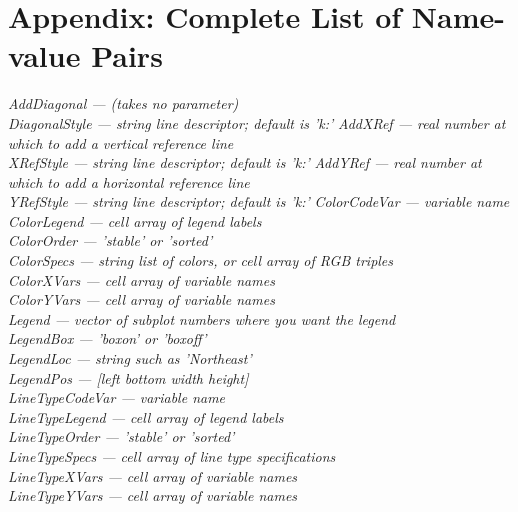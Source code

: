 \documentclass{article}
\newcommand{\namevalue}[2]{{\it #1 --- #2}}
\begin{document}
\appendix


\section{Appendix: Complete List of Name-value Pairs}

\namevalue{AddDiagonal}{(takes no parameter)} \\  %
\hspace*{1cm} \namevalue{DiagonalStyle}{string line descriptor; default is 'k:'}
\namevalue{AddXRef}{real number at which to add a vertical reference line} \\
\hspace*{1cm} \namevalue{XRefStyle}{string line descriptor; default is 'k:'}
\namevalue{AddYRef}{real number at which to add a horizontal reference line} \\
\hspace*{1cm} \namevalue{YRefStyle}{string line descriptor; default is 'k:'}
\namevalue{ColorCodeVar}{variable name} \\
\namevalue{ColorLegend}{cell array of legend labels} \\
\namevalue{ColorOrder}{'stable' or 'sorted'} \\
\namevalue{ColorSpecs}{string list of colors, or cell array of RGB triples} \\
\namevalue{ColorXVars}{cell array of variable names} \\
\namevalue{ColorYVars}{cell array of variable names} \\
\namevalue{Legend}{vector of subplot numbers where you want the legend} \\
\namevalue{LegendBox}{'boxon' or 'boxoff'} \\
\namevalue{LegendLoc}{string such as 'Northeast'} \\
\namevalue{LegendPos}{[left bottom width height]} \\
\namevalue{LineTypeCodeVar}{variable name} \\
\namevalue{LineTypeLegend}{cell array of legend labels} \\
\namevalue{LineTypeOrder}{'stable' or 'sorted'} \\
\namevalue{LineTypeSpecs}{cell array of line type specifications} \\
\namevalue{LineTypeXVars}{cell array of variable names} \\
\namevalue{LineTypeYVars}{cell array of variable names} \\
\end{document}
